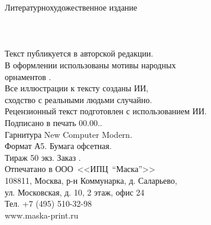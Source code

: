 

{
\newpage
\thispagestyle{empty}
\begin{center}
{\small Литературно\sdash художественное издание}\\
\vspace{1.3cm}
{\Large \MyVarAuthorName}\\
\vspace{1.3cm}
{\Large\textbf\MyVarBookName}\\
\vspace{0.4cm}
{\large\textbf\MyVarBookNamesec}\\
\vspace{1.0cm}
{\small%
Текст публикуется в авторской редакции.\\
\vspace{1.0cm}
В оформлении использованы мотивы народных\\
орнаментов \cite{КарельскаяВышивка,Королькова}.\\
Все иллюстрации к тексту созданы ИИ,\\
сходство с реальными людьми случайно.\\
Рецензионный текст подготовлен с использованием ИИ.\\
\vspace{1.0cm}
Подписано в печать 00.00.\year.\\
Гарнитура New Computer Modern.\\
Формат А5. Бумага офсетная.\\
Тираж 50 экз. Заказ .\\
\vspace{1.0cm}
Отпечатано в ООО~<<ИПЦ~"`Маска"'>>\\
108811, Москва, р-н Коммунарка, д. Саларьево,\\
ул. Московская, д. 10, 2 этаж, офис 24\\
Тел. +7 (495) 510-32-98\\
www.maska-print.ru
}
\end{center}
}